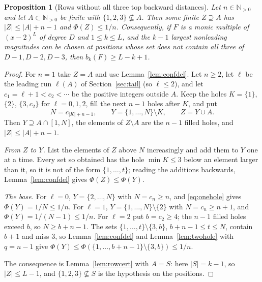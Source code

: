 \documentclass[11pt]{article}
\newtheorem{proposition}[theorem]{Proposition}
\newcommand{\N}{\mathbb N}
\begin{document}
\begin{proposition}[Rows without all three top backward distances]\label{prop:rowsfree}
Let $n\in\N_{>0}$ and let $A\subset\N_{>0}$ be finite with
$\{1,2,3\}\not\subseteq A$.  Then some finite $Z\supseteq A$ has
$|Z|\le|A|+n-1$ and $\Phi(Z)\le1/n$.  Consequently, if $F$ is a monic
multiple of $(x-2)^L$ of degree $D$ and $1\le k\le L$, and the $k-1$ largest
nonleading magnitudes can be chosen at positions whose set does not contain all
three of $D-1,D-2,D-3$, then $b_k(F)\ge L-k+1$.
\end{proposition}

\begin{proof}
For $n=1$ take $Z=A$ and use Lemma~\ref{lem:confdel}.  Let $n\ge2$, let $\ell$
be the leading run $\ell(A)$ of Section~\ref{sec:tail} (so $\ell\le2$), and let $c_1=\ell+1<c_2<\cdots$ be the
positive integers outside $A$.  Keep the holes
$K=\{1\}$, $\{2\}$, $\{3,c_2\}$ for $\ell=0,1,2$, fill the next $n-1$ holes
after $K$, and put
\[
  N=c_{|K|+n-1},\qquad Y=\{1,\ldots,N\}\setminus K,\qquad Z=Y\cup A .
\]
Then $Y\supseteq A\cap[1,N]$, the elements of $Z\setminus A$ are the $n-1$
filled holes, and $|Z|\le|A|+n-1$.

\emph{From $Z$ to $Y$.}  List the elements of $Z$ above $N$ increasingly and
add them to $Y$ one at a time.  Every set so obtained has the hole
$\min K\le3$ below an element larger than it, so it is not of the form
$\{1,\ldots,t\}$; reading the additions backwards, Lemma~\ref{lem:confdel}
gives $\Phi(Z)\le\Phi(Y)$.

\emph{The base.}  For $\ell=0$, $Y=\{2,\ldots,N\}$ with $N=c_n\ge n$, and
\eqref{eq:onehole} gives $\Phi(Y)=1/N\le1/n$.  For $\ell=1$,
$Y=\{1,\ldots,N\}\setminus\{2\}$ with $N=c_n\ge n+1$, and
$\Phi(Y)=1/(N-1)\le1/n$.  For $\ell=2$ put $b=c_2\ge4$; the $n-1$ filled holes
exceed $b$, so $N\ge b+n-1$.  The sets
$\{1,\ldots,t\}\setminus\{3,b\}$, $b+n-1\le t\le N$, contain $b+1$ and miss
$3$, so Lemma~\ref{lem:confdel} and Lemma~\ref{lem:twohole} with $q=n-1$ give
$\Phi(Y)\le\Phi(\{1,\ldots,b+n-1\}\setminus\{3,b\})\le1/n$.

The consequence is Lemma~\ref{lem:rowcert} with $A=S$: here $|S|=k-1$, so
$|Z|\le L-1$, and $\{1,2,3\}\not\subseteq S$ is the hypothesis on the
positions.
\end{proof}
\end{document}
